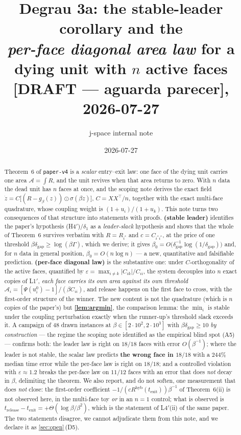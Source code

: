 \documentclass[11pt]{article}
\title{Degrau 3a: the stable-leader corollary and the\\
\emph{per-face diagonal area law} for a dying unit with $n$ active faces\\
\large [DRAFT --- aguarda parecer], 2026-07-27}
\author{j-space internal note}
\date{2026-07-27}
\theoremstyle{remark}
\newcommand{\texit}{t_{\mathrm{exit}}}
\newcommand{\trel}{t_{\mathrm{release}}}
\newcommand{\Ar}{\mathcal{A}}
\newcommand{\hyb}{\mathrm{hyb}}
\newcommand{\dgap}{\delta_{\mathrm{gap}}}
\newcommand{\hyplabel}[1]{\textup{(#1)}}
\begin{document}
\maketitle

\begin{abstract}
Theorem~6 of \texttt{paper-v4} is a \emph{scalar} entry--exit law: one face of
the dying unit carries one area $\Ar=\int R$, and the unit revives when that
area returns to zero. With $n$ data the dead unit has $n$ faces at once, and the
scoping note \cite{scoping} derives the exact field
$\dot z=C\bigl[(R-g_\beta(z))\odot\sigma(\beta z)\bigr]$, $C=XX^\top/n$, together
with the exact multi-face quadrature, whose coupling weight is
$(1+u_i)/(1+u_k)$. This note turns two consequences of that structure into
statements with proofs. \textbf{ (stable leader)} identifies the
paper's hypothesis \hyplabel{H4$'$}/$\delta_1$ as a \emph{leader-slack}
hypothesis and shows that the whole of Theorem~6 survives verbatim with
$R=R_{i^\ast}$ and $c=C_{i^\ast i^\ast}$, at the price of one threshold
$\beta\dgap\ge\log(\beta\Gamma)$, which we derive; it gives
$\beta_0=O\bigl(\dgap^{-1}\log(1/\dgap)\bigr)$ and, for $n$ data in general
position, $\beta_0=O(n\log n)$ --- a new, quantitative and falsifiable
prediction. \textbf{ (per-face diagonal law)} is the substantive
one: under $C$-orthogonality of the active faces, quantified by
$\varepsilon=\max_{i\ne k}|C_{ik}|/C_{ii}$, the system decouples into $n$ exact
copies of L1$'$, \emph{each face carries its own area against its own threshold}
$\Ar_i=[\Psi(u_i^0)-1]/(\beta C_{ii})$, and release happens on the first face to
cross, with the first-order structure of the winner. The new content is not the
quadrature (which is $n$ copies of the paper's) but \textbf{\cref{lem:argmin}},
the comparison lemma: the $\min_i$ is stable under the coupling perturbation
exactly when the runner-up's threshold slack exceeds it. A campaign of $48$
drawn instances at $\beta\in[2\cdot10^2,2\cdot10^3]$ with
$\beta\dgap\ge10$ \emph{by construction} --- the regime the scoping note
identified as the empirical blind spot (A5) --- confirms both: the leader law is
right on $18/18$ faces with error $O(\beta^{-1})$; where the leader is not
stable, the scalar law predicts \textbf{the wrong face in $18/18$} with a
$244\%$ median time error while the per-face law is right on $18/18$; and a
controlled violation with $\varepsilon\approx1.2$ breaks the per-face law on
$11/12$ faces with an error that does \emph{not} decay in $\beta$, delimiting
the theorem. We also report, and do not soften, one measurement that does
\emph{not} close: the first-order coefficient $-1/(cR^{\hyb}(\texit))\beta^{-1}$
of Theorem~6(ii) is not observed here, in the multi-face toy \emph{or} in an
$n=1$ control; what is observed is $\trel-\texit=+\Theta(\log\beta/\beta^2)$,
which is the statement of L4$'$(ii) of the same paper. The two statements
disagree, we cannot adjudicate them from this note, and we declare it as
\cref{sec:open}\,(D5).
\end{abstract}
\end{document}
